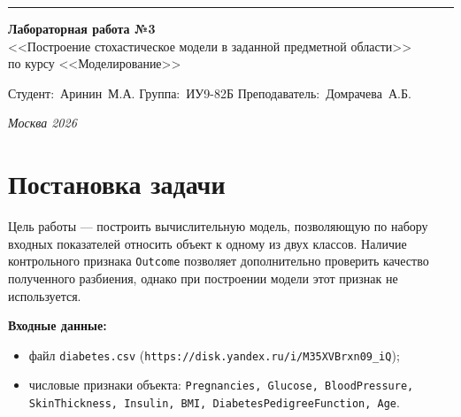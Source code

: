 \documentclass[a4paper, 14pt]{extarticle}
\begin{document}
\begin{titlepage}
\vspace*{-16pt}
\hspace{30pt}\rule{0.866\textwidth}{0.4pt}

\vspace{11em}

\begin{center}
\Large {\bf Лабораторная работа №3} \\ 
\large <<Построение стохастическое модели в заданной предметной области>> \\
\large {по курсу <<Моделирование>>} \\

\end{center}\normalsize

\vspace{8em}

\vbox{%
\hfill%
\vbox{%
\hbox{Студент: Аринин М.А.}%
\hbox{Группа: ИУ9-82Б}%
\hbox{Преподаватель: Домрачева А.Б.}%
}%
} 

\bigskip

\vfill


\begin{center}
\textsl{Москва 2026}
\end{center}
\end{titlepage}


\renewcommand{\ttdefault}{pcr}

\setlength{\tabcolsep}{3pt}

\newpage
\setcounter{page}{2}

\section{Постановка задачи}
Цель работы --- построить вычислительную модель, позволяющую по набору входных показателей относить объект к одному из двух классов. Наличие контрольного признака \texttt{Outcome} позволяет дополнительно проверить качество полученного разбиения, однако при построении модели этот признак не используется.

\textbf{Входные данные:}
\begin{itemize}
  \item файл \texttt{diabetes.csv} (\texttt{https://disk.yandex.ru/i/M35XVBrxn09\_iQ});
  \item числовые признаки объекта: \texttt{Pregnancies, Glucose, BloodPressure, SkinThickness, Insulin, BMI, DiabetesPedigreeFunction, Age}.
\end{itemize}
\end{document}

